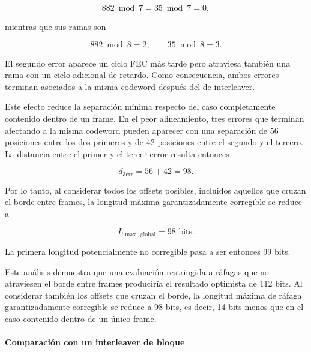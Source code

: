 \documentclass[10pt,a4paper]{article}
\begin{document}
\begin{equation}
    882\bmod7
    =
    35\bmod7
    =
    0,
\end{equation}

mientras que sus ramas son

\begin{equation}
    882\bmod8=2,
    \qquad
    35\bmod8=3.
\end{equation}

El segundo error aparece un ciclo FEC más tarde pero atraviesa también una
rama con un ciclo adicional de retardo. Como consecuencia, ambos errores 
terminan asociados a la misma codeword después del de-interleaver.

Este efecto reduce la separación mínima respecto del caso completamente
contenido dentro de un frame. En el peor alineamiento, tres errores que
terminan afectando a la misma codeword pueden aparecer con una separación de
56 posiciones entre los dos primeros y de 42 posiciones entre el segundo y el
tercero. La distancia entre el primer y el tercer error resulta entonces

\begin{equation}
    d_{\mathrm{3err}}
    =
    56+42
    =
    98.
    \label{eq:span-tres-errores-borde}
\end{equation}

Por lo tanto, al considerar todos los offsets posibles, incluidos aquellos que
cruzan el borde entre frames, la longitud máxima garantizadamente corregible
se reduce a

\begin{equation}
    L_{\max,\mathrm{global}}
    =
    98\text{ bits}.
    \label{eq:rafaga-maxima-global}
\end{equation}

La primera longitud potencialmente no corregible pasa a ser entonces 99 bits.

Este análisis demuestra que una evaluación restringida a ráfagas que no
atraviesen el borde entre frames produciría el resultado optimista de
112 bits. Al considerar también los offsets que cruzan el borde, la longitud
máxima de ráfaga garantizadamente corregible se reduce a 98 bits, es decir,
14 bits menos que en el caso contenido dentro de un único frame.

\paragraph{Comparación con un interleaver de bloque}
\end{document}
